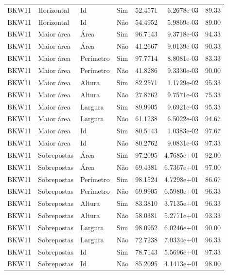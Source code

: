 \begin{tabular}{llllrrr}
    BKW11     & Horizontal  & Id        & Sim         & 52.4571      & 6.2678e-03 & 89.33    \\
    BKW11     & Horizontal  & Id        & Não         & 54.4952      & 5.9869e-03 & 89.00    \\
    BKW11     & Maior área  & Área      & Sim         & 96.7143      & 9.3718e-03 & 94.33    \\
    BKW11     & Maior área  & Área      & Não         & 41.2667      & 9.0139e-03 & 90.33    \\
    BKW11     & Maior área  & Perímetro & Sim         & 97.7714      & 8.8081e-03 & 83.33    \\
    BKW11     & Maior área  & Perímetro & Não         & 41.8286      & 9.3330e-03 & 90.00    \\
    BKW11     & Maior área  & Altura    & Sim         & 82.2571      & 1.1729e-02 & 95.33    \\
    BKW11     & Maior área  & Altura    & Não         & 27.8762      & 9.7571e-03 & 75.33    \\
    BKW11     & Maior área  & Largura   & Sim         & 89.9905      & 9.6921e-03 & 95.33    \\
    BKW11     & Maior área  & Largura   & Não         & 61.1238      & 6.5022e-03 & 94.67    \\
    BKW11     & Maior área  & Id        & Sim         & 80.5143      & 1.0383e-02 & 97.67    \\
    BKW11     & Maior área  & Id        & Não         & 80.2762      & 9.0831e-03 & 97.33    \\
    BKW11     & Sobrepostas & Área      & Sim         & 97.2095      & 4.7685e+01 & 92.00    \\
    BKW11     & Sobrepostas & Área      & Não         & 69.4381      & 6.7367e+01 & 97.00    \\
    BKW11     & Sobrepostas & Perímetro & Sim         & 98.1524      & 4.7298e+01 & 86.67    \\
    BKW11     & Sobrepostas & Perímetro & Não         & 69.9905      & 6.5980e+01 & 96.33    \\
    BKW11     & Sobrepostas & Altura    & Sim         & 83.3810      & 3.7135e+01 & 96.33    \\
    BKW11     & Sobrepostas & Altura    & Não         & 58.0381      & 5.2771e+01 & 93.33    \\
    BKW11     & Sobrepostas & Largura   & Sim         & 98.0952      & 6.0246e+01 & 90.00    \\
    BKW11     & Sobrepostas & Largura   & Não         & 72.7238      & 7.0334e+01 & 96.33    \\
    BKW11     & Sobrepostas & Id        & Sim         & 78.7143      & 5.5696e+01 & 97.33    \\
    BKW11     & Sobrepostas & Id        & Não         & 85.2095      & 4.1413e+01 & 98.00    \\
    \hline
\end{tabular}